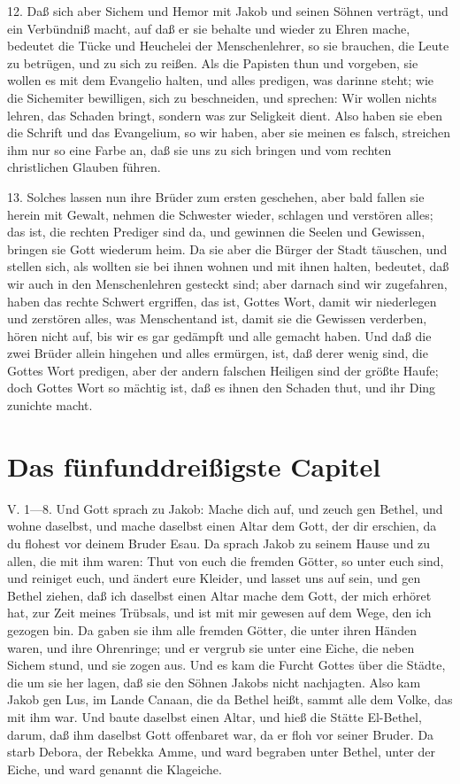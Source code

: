12. Daß sich aber Sichem und Hemor mit Jakob und seinen Söhnen verträgt, und ein Verbündniß macht, auf daß er sie behalte und wieder zu Ehren mache, bedeutet die Tücke und Heuchelei der Menschenlehrer, so sie brauchen, die Leute zu betrügen, und zu sich zu reißen. Als die Papisten thun und vorgeben, sie wollen es mit dem Evangelio halten, und alles predigen, was darinne steht; wie die Sichemiter bewilligen, sich zu beschneiden, und sprechen: Wir wollen nichts lehren, das Schaden bringt, sondern was zur Seligkeit dient. Also haben sie eben die Schrift und das Evangelium, so wir haben, aber sie meinen es falsch, streichen ihm nur so eine Farbe an, daß sie uns zu sich bringen und vom rechten christlichen Glauben führen.

13. Solches lassen nun ihre Brüder zum ersten geschehen, aber bald fallen sie herein mit Gewalt, nehmen die Schwester wieder, schlagen und verstören alles; das ist, die rechten Prediger sind da, und gewinnen die Seelen und Gewissen, bringen sie Gott wiederum heim. Da sie aber die Bürger der Stadt täuschen, und stellen sich, als wollten sie bei ihnen wohnen und mit ihnen halten, bedeutet, daß wir auch in den Menschenlehren gesteckt sind; aber darnach sind wir zugefahren, haben das rechte Schwert ergriffen, das ist, Gottes Wort, damit wir niederlegen und zerstören alles, was Menschentand ist, damit sie die Gewissen verderben, hören nicht auf, bis wir es gar gedämpft und alle gemacht haben. Und daß die zwei Brüder allein hingehen und alles ermürgen, ist, daß derer wenig sind, die Gottes Wort predigen, aber der andern falschen Heiligen sind der größte Haufe; doch Gottes Wort so mächtig ist, daß es ihnen den Schaden thut, und ihr Ding zunichte macht.

\section{Das fünfunddreißigste Capitel}
V. 1—8. Und Gott sprach zu Jakob: Mache dich auf, und zeuch gen Bethel, und wohne daselbst, und mache daselbst einen Altar dem Gott, der dir erschien, da du flohest vor deinem Bruder Esau. Da sprach Jakob zu seinem Hause und zu allen, die mit ihm waren: Thut von euch die fremden Götter, so unter euch sind, und reiniget euch, und ändert eure Kleider, und lasset uns auf sein, und gen Bethel ziehen, daß ich daselbst einen Altar mache dem Gott, der mich erhöret hat, zur Zeit meines Trübsals, und ist mit mir gewesen auf dem Wege, den ich gezogen bin. Da gaben sie ihm alle fremden Götter, die unter ihren Händen waren, und ihre Ohrenringe; und er vergrub sie unter eine Eiche, die neben Sichem stund, und sie zogen aus. Und es kam die Furcht Gottes über die Städte, die um sie her lagen, daß sie den Söhnen Jakobs nicht nachjagten. Also kam Jakob
gen Lus, im Lande Canaan, die da Bethel heißt, sammt alle dem Volke, das mit ihm war. Und baute daselbst einen Altar, und hieß die Stätte El-Bethel, darum, daß ihm daselbst Gott offenbaret war, da er floh vor seiner Bruder. Da starb Debora, der Rebekka Amme, und ward begraben unter Bethel, unter der Eiche, und ward genannt die Klageiche.

